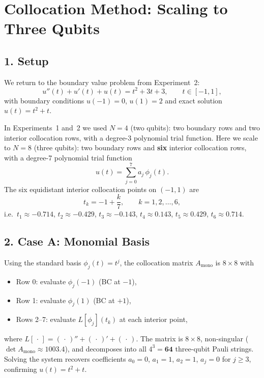 \documentclass{article}
\begin{document}
\section*{Collocation Method: Scaling to Three Qubits}

\subsection*{1. Setup}

We return to the boundary value problem from Experiment~2:
\begin{equation}
    u''(t) + u'(t) + u(t) = t^2 + 3t + 3, \qquad t \in [-1, 1],
\end{equation}
with boundary conditions $u(-1) = 0$, $u(1) = 2$ and exact solution $u(t) = t^2 + t$.

In Experiments~1 and~2 we used $N = 4$ (two qubits): two boundary rows and two
interior collocation rows, with a degree-3 polynomial trial function.  Here we
scale to $N = 8$ (three qubits): two boundary rows and \textbf{six} interior
collocation rows, with a degree-7 polynomial trial function
\begin{equation}
    u(t) = \sum_{j=0}^{7} a_j\,\phi_j(t).
\end{equation}
The six equidistant interior collocation points on $(-1,1)$ are
\begin{equation}
    t_k = -1 + \frac{k}{7}, \qquad k = 1, 2, \ldots, 6,
\end{equation}
i.e.\ $t_1 \approx -0.714$, $t_2 \approx -0.429$, $t_3 \approx -0.143$,
$t_4 \approx 0.143$, $t_5 \approx 0.429$, $t_6 \approx 0.714$.

\subsection*{2. Case A: Monomial Basis}

Using the standard basis $\phi_j(t) = t^j$, the collocation matrix
$A_{\mathrm{mono}}$ is $8\times 8$ with
\begin{itemize}
    \item Row 0: evaluate $\phi_j(-1)$ (BC at $-1$),
    \item Row 1: evaluate $\phi_j(1)$ (BC at $+1$),
    \item Rows 2--7: evaluate $L[\phi_j](t_k)$ at each interior point,
\end{itemize}
where $L[\,\cdot\,] = (\,\cdot\,)'' + (\,\cdot\,)' + (\,\cdot\,)$.  The matrix
is $8\times 8$, non-singular ($\det A_{\mathrm{mono}} \approx 1003.4$), and
decomposes into all $4^3 = \mathbf{64}$ three-qubit Pauli strings.  Solving the
system recovers coefficients $a_0=0$, $a_1=1$, $a_2=1$, $a_j=0$ for $j\geq 3$,
confirming $u(t)=t^2+t$.
\end{document}
